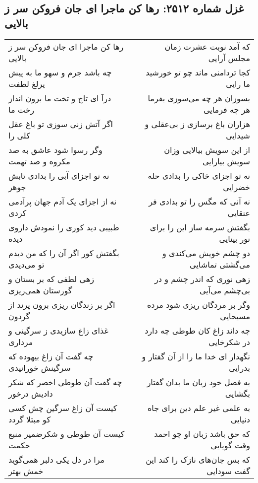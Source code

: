 \begin{center}
\section*{غزل شماره ۲۵۱۲: رها کن ماجرا ای جان فروکن سر ز بالایی}
\label{sec:2512}
\begin{longtable}{l p{0.5cm} r}
رها کن ماجرا ای جان فروکن سر ز بالایی
&&
که آمد نوبت عشرت زمان مجلس آرایی
\\
چه باشد جرم و سهو ما به پیش یرلغ لطفت
&&
کجا تردامنی ماند چو تو خورشید ما رایی
\\
درآ ای تاج و تخت ما برون انداز رخت ما
&&
بسوزان هر چه می‌سوزی بفرما هر چه فرمایی
\\
اگر آتش زنی سوزی تو باغ عقل کلی را
&&
هزاران باغ برسازی ز بی‌عقلی و شیدایی
\\
وگر رسوا شود عاشق به صد مکروه و صد تهمت
&&
از این سویش بیالایی وزان سویش بیارایی
\\
نه تو اجزای آبی را بدادی تابش جوهر
&&
نه تو اجزای خاکی را بدادی حله خضرایی
\\
نه از اجزای یک آدم جهان پرآدمی کردی
&&
نه آنی که مگس را تو بدادی فر عنقایی
\\
طبیبی دید کوری را نمودش داروی دیده
&&
بگفتش سرمه ساز این را برای نور بینایی
\\
بگفتش کور اگر آن را که من دیدم تو می‌دیدی
&&
دو چشم خویش می‌کندی و می‌گشتی تماشایی
\\
زهی لطفی که بر بستان و گورستان همی‌ریزی
&&
زهی نوری که اندر چشم و در بی‌چشم می‌آیی
\\
اگر بر زندگان ریزی برون پرند از گردون
&&
وگر بر مردگان ریزی شود مرده مسیحایی
\\
غذای زاغ سازیدی ز سرگینی و مرداری
&&
چه داند زاغ کان طوطی چه دارد در شکرخایی
\\
چه گفت آن زاغ بیهوده که سرگینش خورانیدی
&&
نگهدار ای خدا ما را از آن گفتار و بدرایی
\\
چه گفت آن طوطی اخضر که شکر دادیش درخور
&&
به فضل خود زبان ما بدان گفتار بگشایی
\\
کیست آن زاغ سرگین چش کسی کو مبتلا گردد
&&
به علمی غیر علم دین برای جاه دنیایی
\\
کیست آن طوطی و شکرضمیر منبع حکمت
&&
که حق باشد زبان او چو احمد وقت گویایی
\\
مرا در دل یکی دلبر همی‌گوید خمش بهتر
&&
که بس جان‌های نازک را کند این گفت سودایی
\\
\end{longtable}
\end{center}
